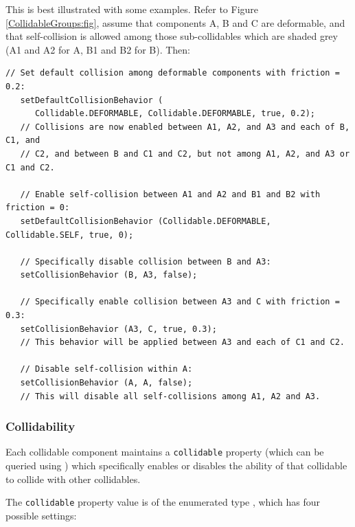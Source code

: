 This is best illustrated with some examples. Refer to Figure
\ref{CollidableGroups:fig}, assume that components A, B and C are
deformable, and that self-collision is allowed among those
sub-collidables which are shaded grey (A1 and A2 for A, B1 and B2 for
B). Then:
%
\begin{lstlisting}[]
   // Set default collision among deformable components with friction = 0.2:
   setDefaultCollisionBehavior (
      Collidable.DEFORMABLE, Collidable.DEFORMABLE, true, 0.2);
   // Collisions are now enabled between A1, A2, and A3 and each of B, C1, and
   // C2, and between B and C1 and C2, but not among A1, A2, and A3 or C1 and C2.

   // Enable self-collision between A1 and A2 and B1 and B2 with friction = 0:
   setDefaultCollisionBehavior (Collidable.DEFORMABLE, Collidable.SELF, true, 0);
    
   // Specifically disable collision between B and A3:
   setCollisionBehavior (B, A3, false);

   // Specifically enable collision between A3 and C with friction = 0.3:
   setCollisionBehavior (A3, C, true, 0.3);
   // This behavior will be applied between A3 and each of C1 and C2.

   // Disable self-collision within A:
   setCollisionBehavior (A, A, false);
   // This will disable all self-collisions among A1, A2 and A3.
\end{lstlisting}
%

\subsubsection{Collidability}
\label{collidability:sec}

Each collidable component maintains a {\tt collidable} property
(which can be queried using
)
which specifically enables or disables the ability of that collidable
to collide with other collidables.

The {\tt collidable} property value is of the enumerated type
, which
has four possible settings:


